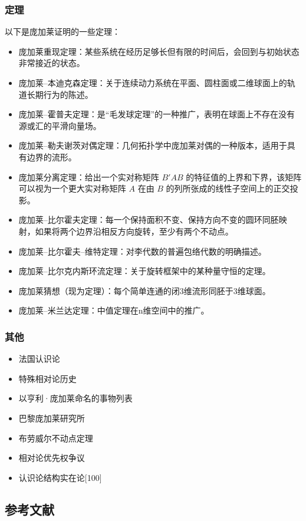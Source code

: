 \subsubsection{定理} 
以下是庞加莱证明的一些定理：
\begin{itemize}
\item 庞加莱重现定理：某些系统在经历足够长但有限的时间后，会回到与初始状态非常接近的状态。  
\item 庞加莱–本迪克森定理：关于连续动力系统在平面、圆柱面或二维球面上的轨道长期行为的陈述。  
\item 庞加莱–霍普夫定理：是“毛发球定理”的一种推广，表明在球面上不存在没有源或汇的平滑向量场。  
\item 庞加莱–勒夫谢茨对偶定理：几何拓扑学中庞加莱对偶的一种版本，适用于具有边界的流形。  
\item 庞加莱分离定理：给出一个实对称矩阵 \( B'AB \) 的特征值的上界和下界，该矩阵可以视为一个更大实对称矩阵 \( A \) 在由 \( B \) 的列所张成的线性子空间上的正交投影。  
\item 庞加莱–比尔霍夫定理：每一个保持面积不变、保持方向不变的圆环同胚映射，如果将两个边界沿相反方向旋转，至少有两个不动点。  
\item 庞加莱–比尔霍夫–维特定理：对李代数的普遍包络代数的明确描述。  
\item 庞加莱–比尔克内斯环流定理：关于旋转框架中的某种量守恒的定理。  
\item 庞加莱猜想（现为定理）：每个简单连通的闭3维流形同胚于3维球面。  
\item 庞加莱–米兰达定理：中值定理在n维空间中的推广。
\end{itemize}
\subsubsection{其他} 
\begin{itemize}
\item 法国认识论  
\item 特殊相对论历史  
\item 以亨利·庞加莱命名的事物列表  
\item 巴黎庞加莱研究所  
\item 布劳威尔不动点定理  
\item 相对论优先权争议  
\item 认识论结构实在论[100]  
\end{itemize}
\subsection{参考文献}
